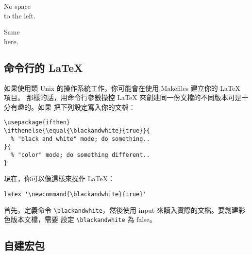 \begin{example}
\newenvironment{correct}%
 {\noindent\ignorespaces}%
 {\par\noindent%
   \ignorespacesafterend}

\begin{correct}
No space\\to the left.
\end{correct}
Same\\here.
\end{example}

\subsection{命令行的 \LaTeX}
如果使用類 Unix 的操作系統工作，你可能會在使用 Makefiles 建立你的 \LaTeX{} 項目。
那樣的話，用命令行參數操控 \LaTeX{} 來創建同一份文檔的不同版本可是十分有趣的。如果
把下列設定寫入你的文檔：
\begin{verbatim}
\usepackage{ifthen}
\ifthenelse{\equal{\blackandwhite}{true}}{
  % "black and white" mode; do something..
}{
  % "color" mode; do something different..
}
\end{verbatim}

現在，你可以像這樣來操作 \LaTeX{}：
\begin{verbatim}
latex '\newcommand{\blackandwhite}{true}'
\end{verbatim}

首先，定義命令 \verb|\blackandwhite|，然後使用 input 來讀入實際的文檔。要創建彩色版本文檔，需要
設定 \verb|\blackandwhite| 為 false。

\subsection{自建宏包}

